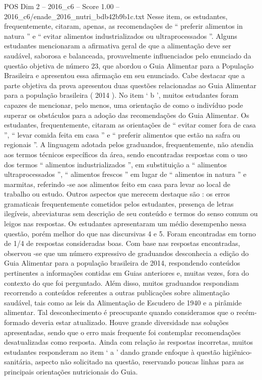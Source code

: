 \begin{textsample}{POS Dim 2 – 2016\_c6 – Score 1.00 – 2016\_c6/enade\_2016\_nutri\_bdb42b9b1c.txt}
Nesse item, os estudantes, frequentemente, citaram, apenas, as recomendações de “ preferir alimentos in natura ” e “ evitar alimentos industrializados ou ultraprocessados ”.
Alguns estudantes mencionaram a afirmativa geral de que a alimentação deve ser saudável, saborosa e balanceada, provavelmente influenciados pelo enunciado da questão objetiva de número 23, que abordou o Guia Alimentar para a População Brasileira e apresentou essa afirmação em seu enunciado.
Cabe destacar que a parte objetiva da prova apresentou duas questões relacionadas ao Guia Alimentar para a população brasileira ( 2014 ).
No item ‘ b ’, muitos estudantes foram capazes de mencionar, pelo menos, uma orientação de como o indivíduo pode superar os obstáculos para a adoção das recomendações do Guia Alimentar.
Os estudantes, frequentemente, citaram as orientações de “ evitar comer fora de casa ”, “ levar comida feita em casa ” e “ preferir alimentos que estão na safra ou regionais ”.
A linguagem adotada pelos graduandos, frequentemente, não atendia aos termos técnicos específicos da área, sendo encontradas respostas com o uso dos termos “ alimentos industrializados ”, em substituição a “ alimentos ultraprocessados ”, “ alimentos frescos ” em lugar de “ alimentos in natura ” e marmitas, referindo -se aos alimentos feito em casa para levar ao local de trabalho ou estudo.
Outros aspectos que merecem destaque são : os erros gramaticais frequentemente cometidos pelos estudantes, presença de letras ilegíveis, abreviaturas sem descrição de seu conteúdo e termos do senso comum ou leigos nas respostas.
Os estudantes apresentaram um médio desempenho nessa questão, porém melhor do que nas discursivas 4 e 5.
Foram encontradas em torno de 1/4 de respostas consideradas boas.
Com base nas respostas encontradas, observou -se que um número expressivo de graduandos desconhecia a edição do Guia Alimentar para a população brasileira de 2014, respondendo conteúdos pertinentes a informações contidas em Guias anteriores e, muitas vezes, fora do contexto do que foi perguntado.
Além disso, muitos graduandos respondiam recorrendo a conteúdos referentes a outras publicações sobre alimentação saudável, tais como as leis da Alimentação de Escudero de 1940 e a pirâmide alimentar.
Tal desconhecimento é preocupante quando consideramos que o recém-formado deveria estar atualizado.
Houve grande diversidade nas soluções apresentadas, sendo que o erro mais frequente foi contemplar recomendações desatualizadas como resposta.
Ainda com relação às respostas incorretas, muitos estudantes responderam ao item ‘ a ’ dando grande enfoque à questão higiênico-sanitária, aspecto não solicitado na questão, reservando poucas linhas para as principais orientações nutricionais do Guia.

\end{textsample}
